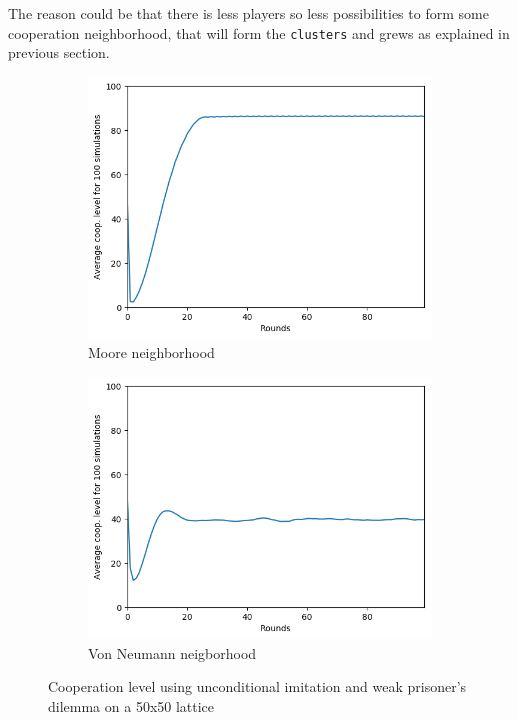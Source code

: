 \documentclass[letterpaper]{article}
\begin{document}
The reason could be that there is less players so less possibilities to
form some cooperation neighborhood, that will form the \texttt{clusters}
and grews as explained in previous section.

\begin{figure}
    \begin{subfigure}{.5\textwidth}
        \centering
        \includegraphics[width=1\linewidth]{images/assign2/50-part1}
        \caption{Moore neighborhood}
        \label{fig:50moorepart1}
    \end{subfigure}
    \begin{subfigure}{.5\textwidth}
        \centering
        \includegraphics[width=1\linewidth]{images/assign2/50_vonneumann-part1}
        \caption{Von Neumann neigborhood}
        \label{fig:50vonpart1}
    \end{subfigure}
    \caption{Cooperation level using unconditional imitation and
    weak prisoner's dilemma on a 50x50 lattice}
    \label{fig:50part1}
\end{figure}
\end{document}
